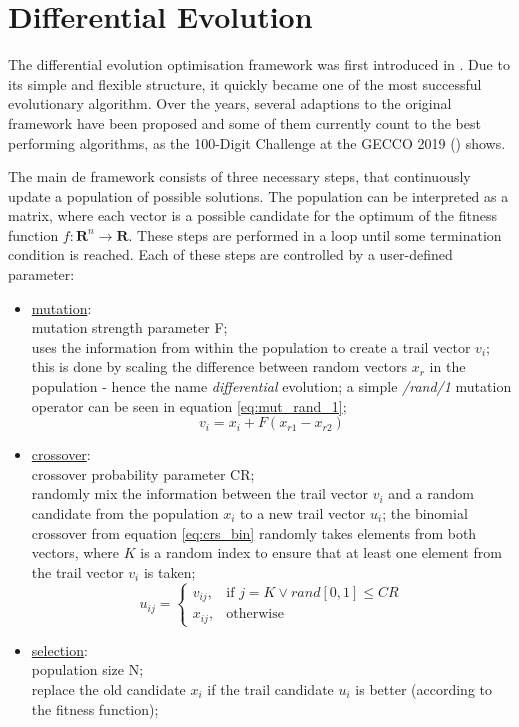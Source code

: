 \documentclass[./\jobname.tex]{subfiles}
\begin{document}
\section{Differential Evolution}

The differential evolution optimisation framework was first introduced in \cite{storn_differential_1997}. Due to its simple and flexible structure, it quickly became one of the most successful evolutionary algorithm. Over the years, several adaptions to the original framework have been proposed and some of them currently count to the best performing algorithms, as the 100-Digit Challenge at the GECCO 2019 (\cite{suganthan_p-n-suganthancec2019_2020}) shows. 

The main \gls{de} framework consists of three necessary steps, that continuously update a population of possible solutions. The population can be interpreted as a matrix, where each vector is a possible candidate for the optimum of the fitness function $f: \mathbf{R}^n \rightarrow \mathbf{R}$. These steps are performed in a loop until some termination condition is reached. Each of these steps are controlled by a user-defined parameter: 
\begin{itemize}
	\item \underline{mutation}: \\
		  mutation strength parameter F;\\
		  uses the information from within the population to create a trail vector $v_i$;\\
		  this is done by scaling the difference between random vectors $x_{r}$ in the population - hence the name \textit{differential} evolution; a simple \textit{/rand/1} mutation operator can be seen in equation \ref{eq:mut_rand_1};
		  \begin{equation}
		  \label{eq:mut_rand_1}
		  v_i = x_{i} + F(x_{r1} - x_{r2})
		  \end{equation}
	\item \underline{crossover}: \\
		  crossover probability parameter CR;\\
		  randomly mix the information between the trail vector $v_i$ and a random candidate from the population $x_{i}$ to a new trail vector $u_i$; the binomial crossover from equation \ref{eq:crs_bin} randomly takes elements from both vectors, where $K$ is a random index to ensure that at least one element from the trail vector $v_i$ is taken;
		  \begin{equation}
		  \label{eq:crs_bin}
		  u_{ij}=\begin{cases}
		  v_{ij}, &\text{if $j = K \lor rand[0,1] \leq CR$}\\
		  x_{ij}, &\text{otherwise}
		  \end{cases}
		  \end{equation}
	\item \underline{selection}: \\
		  population size N;\\
		  replace the old candidate $x_i$ if the trail candidate $u_i$ is better (according to the fitness function);
\end{itemize}  
\end{document}
